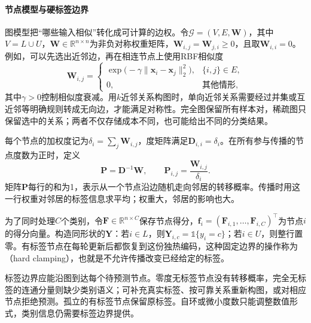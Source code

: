 \paragraph{节点模型与硬标签边界}
\label{sec:classification-label-propagation-structure}
图模型把“哪些输入相似”转化成可计算的边权。令$\mathcal{G}=(V,E,\bm{W})$，其中$V=L\cup U$，$\bm{W}\in\mathbb{R}^{n\times n}$为非负对称权重矩阵，$\bm{W}_{i,j}=\bm{W}_{j,i}\geq0$，且取$\bm{W}_{i,i}=0$。例如，可以先选出近邻边，再在相连节点上使用RBF相似度
\begin{equation}
  \label{eq:classification-label-propagation-weights}
  \bm{W}_{i,j}=
  \begin{cases}
    \exp\bigl(-\gamma\lVert\bm{x}_i-\bm{x}_j\rVert_2^2\bigr),
      & \{i,j\}\in E,\\
    0, & \text{其他情形},
  \end{cases}
\end{equation}
其中$\gamma>0$控制相似度衰减。用$k$近邻关系构图时，单向近邻关系需要经过并集或互近邻等明确规则转成无向边，才能满足对称性。完全图保留所有样本对，稀疏图只保留选中的关系；两者不仅存储成本不同，也可能给出不同的分类结果。

每个节点的加权度记为$\delta_i=\sum_j\bm{W}_{i,j}$，度矩阵满足$\bm{D}_{i,i}=\delta_i$。在所有参与传播的节点度数为正时，定义
\begin{equation}
  \label{eq:classification-label-propagation-transition}
  \bm{P}=\bm{D}^{-1}\bm{W},
  \qquad
  \bm{P}_{i,j}=\frac{\bm{W}_{i,j}}{\delta_i}.
\end{equation}
矩阵$\bm{P}$每行的和为1，表示从一个节点沿边随机走向邻居的转移概率。传播时用这一行权重对邻居的标签信息求平均；权重大，邻居的影响也大。

为了同时处理$C$个类别，令$\bm{F}\in\mathbb{R}^{n\times C}$保存节点得分，$\bm{f}_i=(\bm{F}_{i,1},\dots,\bm{F}_{i,C})^\top$为节点$i$的得分向量。构造同形状的$\bm{Y}$：若$i\in L$，则$\bm{Y}_{i,c}=\mathbb{1}\{y_i=c\}$；若$i\in U$，则整行置零。有标签节点在每轮更新后都恢复到这份独热编码，这种固定边界的操作称为（hard clamping），也就是不允许传播改变已经给定的标签。

标签边界应能沿图到达每个待预测节点。零度无标签节点没有转移概率，完全无标签的连通分量则缺少类别语义；可补充真实标签、按可靠关系重新构图，或对相应节点拒绝预测。孤立的有标签节点保留原标签。自环或微小度数只能调整数值形式，类别信息仍需要标签边界提供。

